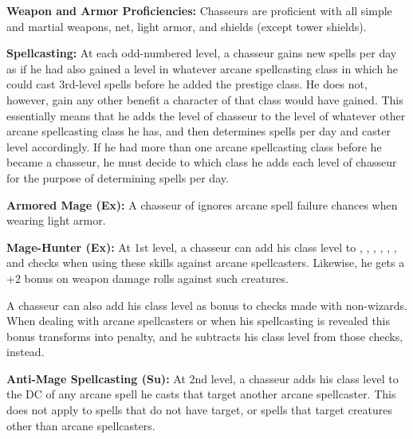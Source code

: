 {
\textbf{Weapon and Armor Proficiencies:} Chasseurs are proficient with all simple and martial weapons, net, light armor, and shields (except tower shields).

\textbf{Spellcasting:} At each odd-numbered level, a chasseur gains new spells per day as if he had also gained a level in whatever arcane spellcasting class in which he could cast 3rd-level spells before he added the prestige class. He does not, however, gain any other benefit a character of that class would have gained. This essentially means that he adds the level of chasseur to the level of whatever other arcane spellcasting class he has, and then determines spells per day and caster level accordingly. If he had more than one arcane spellcasting class before he became a chasseur, he must decide to which class he adds each level of chasseur for the purpose of determining spells per day.

\textbf{Armored Mage (Ex):} A chasseur of ignores arcane spell failure chances when wearing light armor.

\textbf{Mage-Hunter (Ex):} At 1st level, a chasseur can add his class level to , , , , , , and  checks when using these skills against arcane spellcasters. Likewise, he gets a +2 bonus on weapon damage rolls against such creatures.

A chasseur can also add his class level as bonus to  checks made with non-wizards. When dealing with arcane spellcasters or when his spellcasting is revealed this bonus transforms into penalty, and he subtracts his class level from those checks, instead.

\textbf{Anti-Mage Spellcasting (Su):} At 2nd level, a chasseur adds \onehalf his class level to the DC of any arcane spell he casts that target another arcane spellcaster. This does not apply to spells that do not have target, or spells that target creatures other than arcane spellcasters.



}
